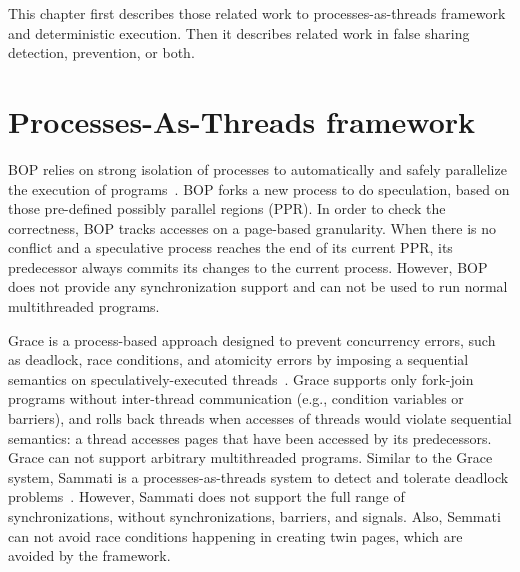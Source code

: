
\label{chapter:relatedwork}
This chapter first describes those related work to processes-as-threads framework and deterministic execution. Then it describes related work in false sharing detection, prevention, or both. 

\section{Processes-As-Threads framework}

BOP relies on strong isolation of processes to automatically and safely parallelize the execution of programs~\cite{DingBOP}. BOP forks a new process to do speculation, based on those pre-defined possibly parallel regions (PPR). In order to check the correctness, BOP tracks accesses on a page-based granularity. When there is no conflict and a speculative process reaches the end of its current PPR, its predecessor always commits its changes to the current process. However, BOP does not provide any synchronization support and can not be used to run normal multithreaded programs. 

Grace is a process-based approach designed to prevent
concurrency errors, such as deadlock, race conditions, and
atomicity errors by imposing a sequential semantics on
speculatively-executed threads~\cite{grace}. Grace supports only fork-join programs without inter-thread communication (e.g., condition variables or barriers), and rolls back threads when accesses of threads would violate sequential semantics: a thread accesses pages that have been accessed by its predecessors. Grace can not support arbitrary multithreaded programs. Similar to the Grace system, Sammati is a processes-as-threads system to detect and tolerate deadlock problems~\cite{Pyla:2010:ADA:1854273.1854288}. However, Sammati does not support the full range of synchronizations, without synchronizations, barriers, and signals. Also, Semmati can not avoid race conditions happening in creating twin pages, which are avoided by the \Sheriff{} framework.

\begin{comment}
According to Revisions,  Grace cannot easily resolve all
conflicts on commit (like revisions do) and must thus restrict
tasks from producing such conflicts either statically (by type
system) or dynamically (pessimistic with blocking, or optimistic with abort and retry). Also, Grace allows only a restricted “fork-join” form of concurrency
Revisions~\ref{Burckhardt:2010:CPR:1869459.1869515}
\end{comment}

